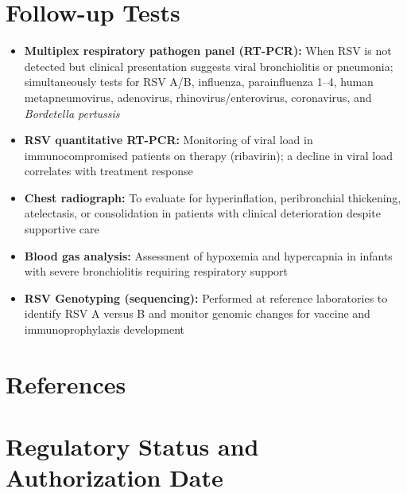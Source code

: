 \section*{Follow-up Tests}
\begin{itemize}
  \item \textbf{Multiplex respiratory pathogen panel (RT-PCR):} When RSV is not detected but clinical presentation suggests viral bronchiolitis or pneumonia; simultaneously tests for RSV A/B, influenza, parainfluenza 1--4, human metapneumovirus, adenovirus, rhinovirus/enterovirus, coronavirus, and \textit{Bordetella pertussis}
  \item \textbf{RSV quantitative RT-PCR:} Monitoring of viral load in immunocompromised patients on therapy (ribavirin); a decline in viral load correlates with treatment response
  \item \textbf{Chest radiograph:} To evaluate for hyperinflation, peribronchial thickening, atelectasis, or consolidation in patients with clinical deterioration despite supportive care
  \item \textbf{Blood gas analysis:} Assessment of hypoxemia and hypercapnia in infants with severe bronchiolitis requiring respiratory support
  \item \textbf{RSV Genotyping (sequencing):} Performed at reference laboratories to identify RSV A versus B and monitor genomic changes for vaccine and immunoprophylaxis development
\end{itemize}

\section*{References}



\clearpage
\section*{Regulatory Status and Authorization Date}

\clearpage
